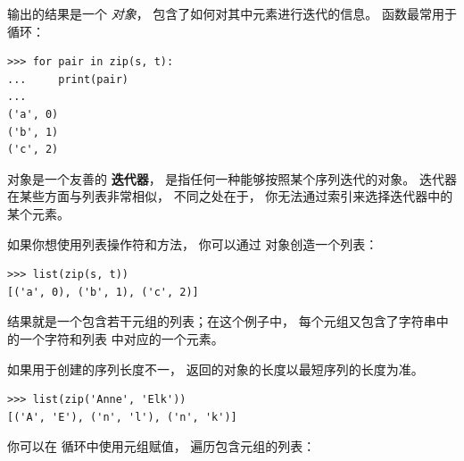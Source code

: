 {输出的结果是一个 {\em {} 对象}， 包含了如何对其中元素进行迭代的信息。
 函数最常用于  循环：

\begin{lstlisting}
>>> for pair in zip(s, t):
...     print(pair)
...
('a', 0)
('b', 1)
('c', 2)
\end{lstlisting}

%

\href{https://docs.python.org/3/library/functions.html#zip}{}对象是一个友善的 {\bf 迭代器}， 是指任何一种能够按照某个序列迭代的对象。  迭代器在某些方面与列表非常相似， 不同之处在于， 你无法通过索引来选择迭代器中的某个元素。
 


如果你想使用列表操作符和方法， 你可以通过 对象创造一个列表：

\begin{lstlisting}
>>> list(zip(s, t))
[('a', 0), ('b', 1), ('c', 2)]
\end{lstlisting}

%

结果就是一个包含若干元组的列表；在这个例子中， 每个元组又包含了字符串中的一个字符和列表  中对应的一个元素。


如果用于创建的序列长度不一， 返回的对象的长度以最短序列的长度为准。

\begin{lstlisting}
>>> list(zip('Anne', 'Elk'))
[('A', 'E'), ('n', 'l'), ('n', 'k')]
\end{lstlisting}

%

你可以在  循环中使用元组赋值， 遍历包含元组的列表：

  

}
